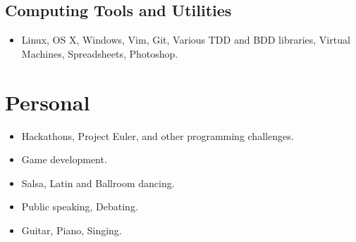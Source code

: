 \documentclass{jcgcv}
\begin{document}
\begin{column}
\subsection{Computing Tools and Utilities}
\begin{itemize}
  \item Linux, OS X, Windows, Vim, Git, Various TDD and BDD libraries, Virtual Machines, Spreadsheets, Photoshop.
\end{itemize}



\section{Personal}

\begin{itemize}
  \item Hackathons, Project Euler, and other programming challenges.
  \item Game development.
  \item Salsa, Latin and Ballroom dancing.
  \item Public speaking, Debating.
  \item Guitar, Piano, Singing.
\end{itemize}


\end{column}
\end{document}
